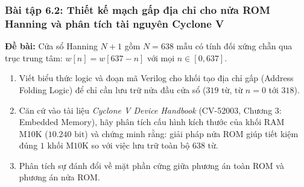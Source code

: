 \subsubsection*{Bài tập 6.2: Thiết kế mạch gấp địa chỉ cho nửa ROM Hanning và phân tích tài nguyên Cyclone V}
\textbf{Đề bài:} Cửa sổ Hanning $N+1$ gồm $N = 638\text{ mẫu}$ có tính đối xứng chẵn qua trục trung tâm: $w[n] = w[637 - n]$ với mọi $n \in [0, 637]$.
\begin{enumerate}[label=(\alph*)]
    \item Viết biểu thức logic và đoạn mã Verilog cho khối tạo địa chỉ gấp (Address Folding Logic) để chỉ cần lưu trữ nửa đầu cửa sổ ($319\text{ từ}$, từ $n = 0$ tới $318$).
    \item Căn cứ vào tài liệu \emph{Cyclone V Device Handbook} (CV-52003, Chương 3: Embedded Memory), hãy phân tích cấu hình kích thước của khối RAM M10K ($10.240\text{ bit}$) và chứng minh rằng: giải pháp nửa ROM giúp tiết kiệm đúng $1\text{ khối M10K}$ so với việc lưu trữ toàn bộ $638\text{ từ}$.
    \item Phân tích sự đánh đổi về mặt phần cứng giữa phương án toàn ROM và phương án nửa ROM.
\end{enumerate}

